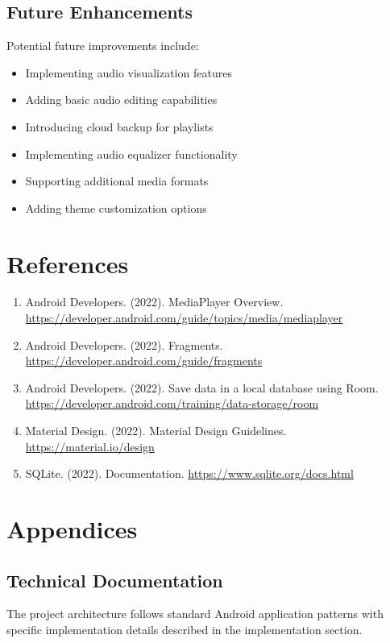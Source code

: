 \documentclass{article}
\begin{document}
\subsection{Future Enhancements}
Potential future improvements include:
\begin{itemize}
    \item Implementing audio visualization features
    \item Adding basic audio editing capabilities
    \item Introducing cloud backup for playlists
    \item Implementing audio equalizer functionality
    \item Supporting additional media formats
    \item Adding theme customization options
\end{itemize}

\section{References}
\begin{enumerate}
    \item Android Developers. (2022). MediaPlayer Overview. \url{https://developer.android.com/guide/topics/media/mediaplayer}
    \item Android Developers. (2022). Fragments. \url{https://developer.android.com/guide/fragments}
    \item Android Developers. (2022). Save data in a local database using Room. \url{https://developer.android.com/training/data-storage/room}
    \item Material Design. (2022). Material Design Guidelines. \url{https://material.io/design}
    \item SQLite. (2022). Documentation. \url{https://www.sqlite.org/docs.html}
\end{enumerate}

\section{Appendices}
\subsection{Technical Documentation}
The project architecture follows standard Android application patterns with specific implementation details described in the implementation section.
\end{document}
